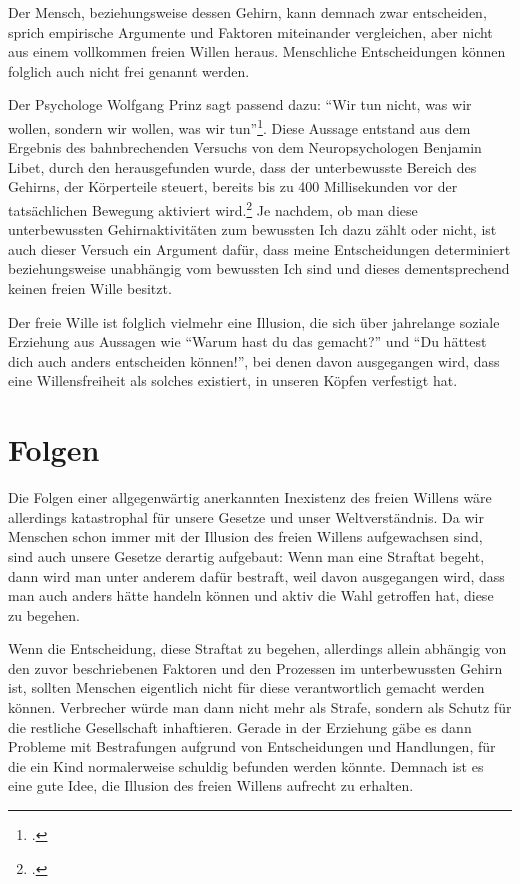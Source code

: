 \documentclass[a4paper, 12pt]{article}
\begin{document}
Der Mensch, beziehungsweise dessen Gehirn, kann demnach zwar entscheiden, sprich empirische Argumente und Faktoren miteinander vergleichen, aber nicht aus einem vollkommen freien Willen heraus. Menschliche Entscheidungen können folglich auch nicht frei genannt werden.

Der Psychologe Wolfgang Prinz sagt passend dazu: \enquote{Wir tun nicht, was wir wollen, sondern wir wollen, was wir tun}\footcite{prinz}. Diese Aussage entstand aus dem Ergebnis des bahnbrechenden Versuchs von dem Neuropsychologen Benjamin Libet, durch den herausgefunden wurde, dass der unterbewusste Bereich des Gehirns, der Körperteile steuert, bereits bis zu 400 Millisekunden vor der tatsächlichen Bewegung aktiviert wird.\footcite{libet} Je nachdem, ob man diese unterbewussten Gehirnaktivitäten zum bewussten Ich dazu zählt oder nicht, ist auch dieser Versuch ein Argument dafür, dass meine Entscheidungen determiniert beziehungsweise unabhängig vom bewussten Ich sind und dieses dementsprechend keinen freien Wille besitzt.

Der freie Wille ist folglich vielmehr eine Illusion, die sich über jahrelange soziale Erziehung aus Aussagen wie \enquote{Warum hast du das gemacht?} und \enquote{Du hättest dich auch anders entscheiden können!}, bei denen davon ausgegangen wird, dass eine Willensfreiheit als solches existiert, in unseren Köpfen verfestigt hat.

\section{Folgen}
Die Folgen einer allgegenwärtig anerkannten Inexistenz des freien Willens wäre allerdings katastrophal für unsere Gesetze und unser Weltverständnis. Da wir Menschen schon immer mit der Illusion des freien Willens aufgewachsen sind, sind auch unsere Gesetze derartig aufgebaut: Wenn man eine Straftat begeht, dann wird man unter anderem dafür bestraft, weil davon ausgegangen wird, dass man auch anders hätte handeln können und aktiv die Wahl getroffen hat, diese zu begehen.

Wenn die Entscheidung, diese Straftat zu begehen, allerdings allein abhängig von den zuvor beschriebenen Faktoren und den Prozessen im unterbewussten Gehirn ist, sollten Menschen eigentlich nicht für diese verantwortlich gemacht werden können. Verbrecher würde man dann nicht mehr als Strafe, sondern als Schutz für die restliche Gesellschaft inhaftieren. Gerade in der Erziehung gäbe es dann Probleme mit Bestrafungen aufgrund von Entscheidungen und Handlungen, für die ein Kind normalerweise schuldig befunden werden könnte. Demnach ist es eine gute Idee, die Illusion des freien Willens aufrecht zu erhalten.
\end{document}
